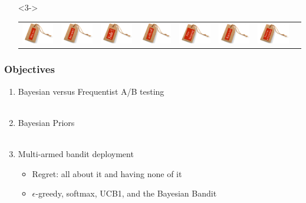 \documentclass[xcolor={dvipsnames}]{beamer}
\begin{document}
{\vspace{-4em}

\setlength{\leftmargini}{-2pt}
\begin{itemize}
\item[]<3->
\setlength\tabcolsep{-1pt}
\begin{tabular}{llllllll}
\includegraphics[height=.425in]{stuff/p6.png}
&\includegraphics[height=.425in]{stuff/p5.png}
&\includegraphics[height=.425in]{stuff/p1.png}
&\includegraphics[height=.425in]{stuff/p2.png}
&\includegraphics[height=.425in]{stuff/p4.png}
&\includegraphics[height=.425in]{stuff/p3.png}
&\includegraphics[height=.425in]{stuff/p7.png}\\
\end{tabular}
\end{itemize}
}


\frame
{
\frametitle{Objectives}

\Large
\begin{enumerate}%
\item Bayesian versus Frequentist A/B testing \\${}$\\
\item Bayesian Priors\\${}$\\
\item Multi-armed bandit deployment
\begin{itemize}
\item Regret: all about it and having none of it
\item $\epsilon$-greedy, softmax, UCB1, and the Bayesian Bandit
\end{itemize}
\end{enumerate}

}
\end{document}
